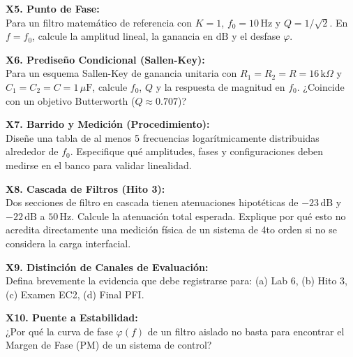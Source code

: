 \documentclass[10pt, a4paper]{article}
\begin{document}
\noindent\textbf{X5. Punto de Fase:}\\
Para un filtro matemático de referencia con $K=1$, $f_0=10\,\mathrm{Hz}$ y $Q=1/\sqrt{2}$. En $f=f_0$, calcule la amplitud lineal, la ganancia en $\mathrm{dB}$ y el desfase $\varphi$.
\vspace{1.5cm}

\noindent\textbf{X6. Prediseño Condicional (Sallen-Key):}\\
Para un esquema Sallen-Key de ganancia unitaria con $R_1=R_2=R=16\,\mathrm{k}\Omega$ y $C_1=C_2=C=1\,\mu\mathrm{F}$, calcule $f_0$, $Q$ y la respuesta de magnitud en $f_0$. ¿Coincide con un objetivo Butterworth ($Q \approx 0.707$)?
\vspace{1.5cm}

\noindent\textbf{X7. Barrido y Medición (Procedimiento):}\\
Diseñe una tabla de al menos 5 frecuencias logarítmicamente distribuidas alrededor de $f_0$. Especifique qué amplitudes, fases y configuraciones deben medirse en el banco para validar linealidad.
\vspace{1.5cm}

\noindent\textbf{X8. Cascada de Filtros (Hito 3):}\\
Dos secciones de filtro en cascada tienen atenuaciones hipotéticas de $-23\,\mathrm{dB}$ y $-22\,\mathrm{dB}$ a $50\,\mathrm{Hz}$. Calcule la atenuación total esperada. Explique por qué esto no acredita directamente una medición física de un sistema de 4to orden si no se considera la carga interfacial.
\vspace{1.5cm}

\noindent\textbf{X9. Distinción de Canales de Evaluación:}\\
Defina brevemente la evidencia que debe registrarse para: (a) Lab 6, (b) Hito 3, (c) Examen EC2, (d) Final PFI.
\vspace{1.5cm}

\noindent\textbf{X10. Puente a Estabilidad:}\\
¿Por qué la curva de fase $\varphi(f)$ de un filtro aislado no basta para encontrar el Margen de Fase (PM) de un sistema de control?
\vspace{1.5cm}
\end{document}
